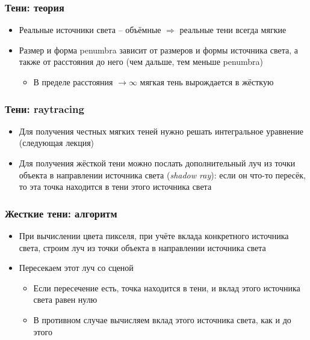 \documentclass[10pt,handout]{beamer}
\begin{document}
\begin{frame}[fragile]
\frametitle{Тени: теория}
\begin{itemize}
\item Реальные источники света -- объёмные \begin{math}\Longrightarrow\end{math} реальные тени всегда мягкие
\pause
\item Размер и форма penumbra зависит от размеров и формы источника света, а также от расстояния до него (чем дальше, тем меньше penumbra)
\pause
\begin{itemize}
\item В пределе расстояния \begin{math}\rightarrow\infty\end{math} мягкая тень вырождается в жёсткую
\end{itemize}
\end{itemize}
\end{frame}

\begin{frame}[fragile]
\frametitle{Тени: raytracing}
\begin{itemize}
\item Для получения честных мягких теней нужно решать интегральное уравнение (следующая лекция)
\pause
\item Для получения жёсткой тени можно послать дополнительный луч из точки объекта в направлении источника света (\textit{shadow ray}): если он что-то пересёк, то эта точка находится в тени этого источника света
\end{itemize}
\end{frame}

\begin{frame}[fragile]
\frametitle{Жесткие тени: алгоритм}
\begin{itemize}
\item При вычислении цвета пикселя, при учёте вклада конкретного источника света, строим луч из точки объекта в направлении источника света
\pause
\item Пересекаем этот луч со сценой
\pause
\begin{itemize}
\item Если пересечение есть, точка находится в тени, и вклад этого источника света равен нулю
\pause
\item В противном случае вычисляем вклад этого источника света, как и до этого
\end{itemize}
\end{itemize}
\end{frame}
\end{document}

